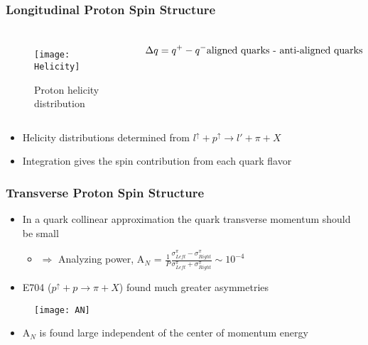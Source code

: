 \begin{frame}
  \frametitle{Longitudinal Proton Spin Structure}

  \begin{columns}
    \setlength\abovecaptionskip{-5pt}
    \setlength{\belowcaptionskip}{-1pt}
    \begin{figure}
      \vspace*{-0.3cm}
      \centering
      \texttt{[image: Helicity]}
      \caption{Proton helicity distribution}
    \end{figure}
    \begin{dmath*}
      \Delta q = q^+ - q^- \\ \text{aligned quarks - anti-aligned quarks}
    \end{dmath*}
  \end{columns}
  
  \begin{itemize}
  \item Helicity distributions determined from $l^{\uparrow}+p^{\uparrow}
    \rightarrow l' + \pi + X$
  \item Integration gives the spin contribution from each quark flavor
  \end{itemize}
\end{frame}


\begin{frame}
  \frametitle{Transverse Proton Spin Structure}

  \begin{itemize}
  \item In a quark collinear approximation the quark transverse momentum should be small
    \begin{itemize}
    \item [] $\Rightarrow$ Analyzing power, A$_N$ = $\frac{1}{P}\frac{\sigma_{Left}^{\pi} - \sigma_{Right}^{\pi}}{\sigma_{Left}^{\pi} + \sigma_{Right}^{\pi}} \sim 10^{-4}$
    \end{itemize}
  \item E704 ($p^{\uparrow}+p\rightarrow \pi+X$) found much greater asymmetries   \end{itemize}

  \begin{figure}
    \centering
    \texttt{[image: AN]}
  \end{figure}
  \begin{itemize}
  \item A$_N$ is found large independent of the center of momentum energy
  \end{itemize}
\end{frame}


